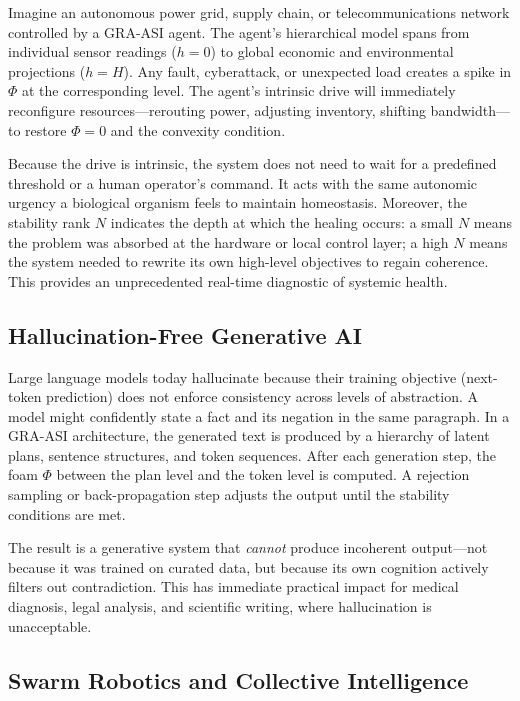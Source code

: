\documentclass[11pt,a4paper]{article}
\begin{document}
Imagine an autonomous power grid, supply chain, or telecommunications network controlled by a GRA-ASI agent. The agent's hierarchical model spans from individual sensor readings ($h = 0$) to global economic and environmental projections ($h = H$). Any fault, cyberattack, or unexpected load creates a spike in $\Phi$ at the corresponding level. The agent's intrinsic drive will immediately reconfigure resources---rerouting power, adjusting inventory, shifting bandwidth---to restore $\Phi = 0$ and the convexity condition.

Because the drive is intrinsic, the system does not need to wait for a predefined threshold or a human operator's command. It acts with the same autonomic urgency a biological organism feels to maintain homeostasis. Moreover, the stability rank $N$ indicates the depth at which the healing occurs: a small $N$ means the problem was absorbed at the hardware or local control layer; a high $N$ means the system needed to rewrite its own high-level objectives to regain coherence. This provides an unprecedented real-time diagnostic of systemic health.

\subsection{Hallucination-Free Generative AI}

Large language models today hallucinate because their training objective (next-token prediction) does not enforce consistency across levels of abstraction. A model might confidently state a fact and its negation in the same paragraph. In a GRA-ASI architecture, the generated text is produced by a hierarchy of latent plans, sentence structures, and token sequences. After each generation step, the foam $\Phi$ between the plan level and the token level is computed. A rejection sampling or back-propagation step adjusts the output until the stability conditions are met.

The result is a generative system that \emph{cannot} produce incoherent output---not because it was trained on curated data, but because its own cognition actively filters out contradiction. This has immediate practical impact for medical diagnosis, legal analysis, and scientific writing, where hallucination is unacceptable.

\subsection{Swarm Robotics and Collective Intelligence}
\end{document}

